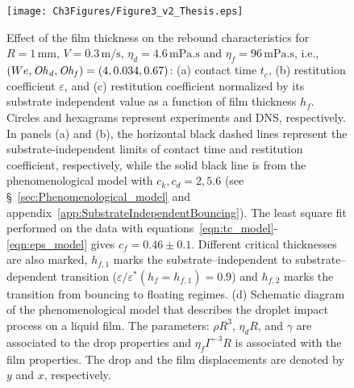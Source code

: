 \begin{figure}
	\centering
	\texttt{[image: Ch3Figures/Figure3\_v2\_Thesis.eps]}
	\caption{Effect of the film thickness on the rebound characteristics for $R = 1\,\si{\milli\meter}$, $V = 0.3\,\si{\meter}/\si{\second}$, $\eta_{d} = 4.6\,\si{\milli\pascal}.\si{\second}$ and $\eta_{f} = 96\,\si{\milli\pascal}.\si{\second}$, i.e., $(We, \mathit{Oh}_\mathit{d}, \mathit{Oh}_\mathit{f}) = (4, 0.034, 0.67)$: (a) contact time $t_{c}$, (b) restitution coefficient $\varepsilon$, and (c) restitution coefficient normalized by its substrate independent value as a function of film thickness $h_{f}$. Circles and hexagrams represent experiments and DNS, respectively. In panels (a) and (b), the horizontal black dashed lines represent the substrate-independent limits of contact time and restitution coefficient, respectively, while the solid black line is from  the phenomenological model with $c_k, c_d = 2, 5.6$ (see \S~\ref{sec:Phenomenological_model} and appendix~\ref{app:SubstrateIndependentBouncing}). The least square fit performed on the data with equations~\eqref{eqn:tc_model}-\eqref{eqn:eps_model} gives $c_f = 0.46 \pm 0.1$. Different critical thicknesses are also marked, $h_{f,1}$ marks the substrate--independent to substrate--dependent transition ($\varepsilon/\varepsilon^*(h_f = h_{f,1}) = 0.9$) and $h_{f,2}$ marks the transition from bouncing to floating regimes.  (d) Schematic diagram of the phenomenological model that describes the droplet impact process on a liquid film. The parameters: $\rho R^{3}$, $\eta_{d}R$, and $\gamma$ are associated to the drop properties and $\eta_{f} \Gamma^{-3} R$ is associated with the film properties. The drop and the film displacements are denoted by $y$ and $x$, respectively.}
	\label{fig:figure03}
\end{figure}

